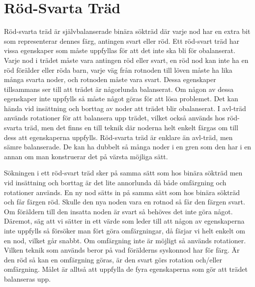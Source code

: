 \documentclass[a5paper,10pt,oneside]{article}
\begin{document}
\section*{Röd-Svarta Träd}

Röd-svarta träd är självbalanserade binära sökträd där varje nod har en extra bit som representerar dennes färg, antingen svart eller röd. Ett röd-svart träd har vissa egenskaper som måste uppfyllas för att det inte ska bli för obalanserat. Varje nod i trädet måste vara antingen röd eller svart, en röd nod kan inte ha en röd förälder eller röda barn, varje väg från rotnoden till löven måste ha lika många svarta noder, och rotnoden måste vara svart. Dessa egenskaper tillsammans ser till att trädet är någorlunda balanserat. Om någon av dessa egenskaper inte uppfylls så måste något göras för att lösa problemet. Det kan hända vid insättning och borttag av noder att trädet blir obalanserat. I avl-träd används rotationer för att balansera upp trädet, vilket också används hos röd-svarta träd, men det finns en till teknik där noderna helt enkelt färgas om till dess att egenskaperna uppfylls. Röd-svarta träd är enklare än avl-träd, men sämre balanserade. De kan ha dubbelt så många noder i en gren som den har i en annan om man konstruerar det på värsta möjliga sätt.

Sökningen i ett röd-svart träd sker på samma sätt som hos binära sökträd men vid insättning och borttag är det lite annorlunda då både omfärgning och rotationer används. En ny nod sätts in på samma sätt som hos binära sökträd och får färgen röd. Skulle den nya noden vara en rotnod så får den färgen svart. Om föräldern till den insatta noden är svart så behöves det inte göra något. Däremot, säg att vi sätter in ett värde som leder till att någon av egenskaperna inte uppfylls så försöker man fört göra omfärgningar, då färjar vi helt enkelt om en nod, vilket går snabbt. Om omfärgning inte är möjligt så används rotationer. Vilken teknik som används beror på vad förälderns syskonnod har för färg. Är den röd så kan en omfärgning göras, är den svart görs rotation och/eller omfärgning. Målet är alltså att uppfylla de fyra egenskaperna som gör att trädet balanseras upp.
\end{document}

